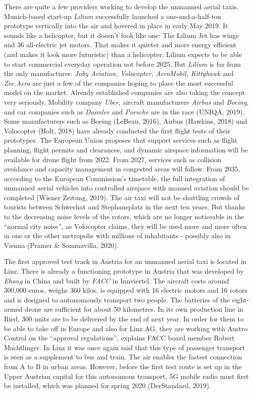 \documentclass[
]{book}
\begin{document}
There are quite a few providers working to develop the unmanned aerial taxis. Munich-based start-up \emph{Lilium} successfully launched a one-and-a-half-ton prototype vertically into the air and hovered in place in early May 2019. It sounds like a helicopter, but it doesn't look like one: The Lilium Jet has wings and 36 all-electric jet motors. That makes it quieter and more energy efficient (and makes it look more futuristic) than a helicopter. Lilium expects to be able to start commercial everyday operation not before 2025.
But \emph{Lilium} is far from the only manufacturer. \emph{Joby Aviation, Volocopter, AeroMobil, Kittyhawk} and \emph{Zee.Aero} are just a few of the companies hoping to place the most successful model on the market. Already established companies are also taking the concept very seriously. Mobility company \emph{Uber}, aircraft manufacturers \emph{Airbus} and \emph{Boeing}, and car companies such as \emph{Daimler} and \emph{Porsche} are in the race (UNIQA, 2019).
Some manufacturers such as Boeing (LeBeau, 2016), Airbus (Hawkins, 2018) and Volocopter (Holt, 2018) have already conducted the first flight tests of their prototypes.
The European Union proposes that support services such as flight planning, flight permits and clearances, and dynamic airspace information will be available for drone flight from 2022. From 2027, services such as collision avoidance and capacity management in congested areas will follow. From 2035, according to the European Commission's timetable, the full integration of unmanned aerial vehicles into controlled airspace with manned aviation should be completed (Wiener Zeitung, 2019).
The air taxi will not be shuttling crowds of tourists between Schwechat and Stephansplatz in the next ten years. But thanks to the decreasing noise levels of the rotors, which are no longer noticeable in the ``normal city noise'', as Volocopter claims, they will be used more and more often in one or the other metropolis with millions of inhabitants - possibly also in Vienna (Pramer \& Sommavilla, 2020).

The first approved test track in Austria for an unmanned aerial taxi is located in Linz. There is already a functioning prototype in Austria that was developed by \emph{Ehang} in China and built by \emph{FACC} in Innviertel. The aircraft costs around 300,000 euros, weighs 360 kilos, is equipped with 16 electric motors and 16 rotors and is designed to autonomously transport two people. The batteries of the eight-armed drone are sufficient for about 50 kilometres. In its own production line in Ried, 300 units are to be delivered by the end of next year. In order for them to be able to take off in Europe and also for Linz AG, they are working with Austro Control on the ``approval regulations'', explains FACC board member Robert Machtlinger.
In Linz it was once again said that this type of passenger transport is seen as a supplement to bus and train. The air enables the fastest connection from A to B in urban areas. However, before the first test route is set up in the Upper Austrian capital for this autonomous transport, 5G mobile radio must first be installed, which was planned for spring 2020 (DerStandard, 2019).
\end{document}
